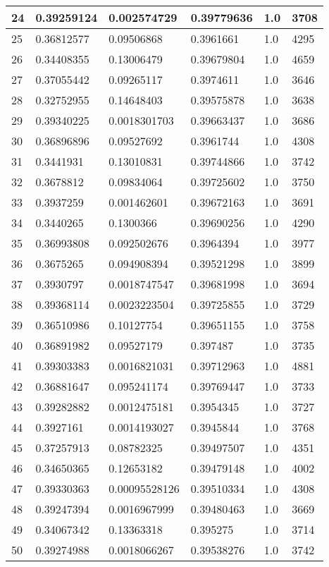\begin{longtable}{|l|l|l|l|l|l|}
24 & 0.39259124 & 0.002574729 & 0.39779636 & 1.0 & 3708 \\ \hline 
25 & 0.36812577 & 0.09506868 & 0.3961661 & 1.0 & 4295 \\ \hline 
26 & 0.34408355 & 0.13006479 & 0.39679804 & 1.0 & 4659 \\ \hline 
27 & 0.37055442 & 0.09265117 & 0.3974611 & 1.0 & 3646 \\ \hline 
28 & 0.32752955 & 0.14648403 & 0.39575878 & 1.0 & 3638 \\ \hline 
29 & 0.39340225 & 0.0018301703 & 0.39663437 & 1.0 & 3686 \\ \hline 
30 & 0.36896896 & 0.09527692 & 0.3961744 & 1.0 & 4308 \\ \hline 
31 & 0.3441931 & 0.13010831 & 0.39744866 & 1.0 & 3742 \\ \hline 
32 & 0.3678812 & 0.09834064 & 0.39725602 & 1.0 & 3750 \\ \hline 
33 & 0.3937259 & 0.001462601 & 0.39672163 & 1.0 & 3691 \\ \hline 
34 & 0.3440265 & 0.1300366 & 0.39690256 & 1.0 & 4290 \\ \hline 
35 & 0.36993808 & 0.092502676 & 0.3964394 & 1.0 & 3977 \\ \hline 
36 & 0.3675265 & 0.094908394 & 0.39521298 & 1.0 & 3899 \\ \hline 
37 & 0.3930797 & 0.0018747547 & 0.39681998 & 1.0 & 3694 \\ \hline 
38 & 0.39368114 & 0.0023223504 & 0.39725855 & 1.0 & 3729 \\ \hline 
39 & 0.36510986 & 0.10127754 & 0.39651155 & 1.0 & 3758 \\ \hline 
40 & 0.36891982 & 0.09527179 & 0.397487 & 1.0 & 3735 \\ \hline 
41 & 0.39303383 & 0.0016821031 & 0.39712963 & 1.0 & 4881 \\ \hline 
42 & 0.36881647 & 0.095241174 & 0.39769447 & 1.0 & 3733 \\ \hline 
43 & 0.39282882 & 0.0012475181 & 0.3954345 & 1.0 & 3727 \\ \hline 
44 & 0.3927161 & 0.0014193027 & 0.3945844 & 1.0 & 3768 \\ \hline 
45 & 0.37257913 & 0.08782325 & 0.39497507 & 1.0 & 4351 \\ \hline 
46 & 0.34650365 & 0.12653182 & 0.39479148 & 1.0 & 4002 \\ \hline 
47 & 0.39330363 & 0.00095528126 & 0.39510334 & 1.0 & 4308 \\ \hline 
48 & 0.39247394 & 0.0016967999 & 0.39480463 & 1.0 & 3669 \\ \hline 
49 & 0.34067342 & 0.13363318 & 0.395275 & 1.0 & 3714 \\ \hline 
50 & 0.39274988 & 0.0018066267 & 0.39538276 & 1.0 & 3742 \\ \hline 
\end{longtable}